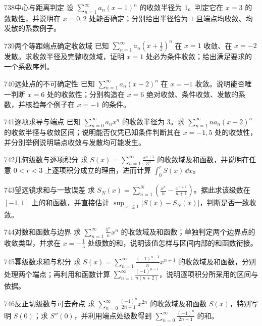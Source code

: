 \begin{exercise}{738}{中心与距离判定}
设 $\sum_{n=1}^{\infty}a_n(x-1)^n$ 的收敛半径为 $1$。判定它在 $x=3$ 的敛散性，并说明在 $x=0,2$ 处能否确定；分别给出半径恰为 $1$ 且端点均收敛、均发散的系数例子。
\end{exercise}
\begin{exercise}{739}{两个等距端点确定收敛域}
已知 $\sum_{n=1}^{\infty}a_n(x+\frac12)^n$ 在 $x=1$ 收敛、在 $x=-2$ 发散。求收敛半径及完整收敛域，证明 $x=1$ 处必为条件收敛；给出满足要求的一个系数序列。
\end{exercise}
\begin{exercise}{740}{远处点的不可确定性}
已知 $\sum_{n=1}^{\infty}a_n(x-2)^n$ 在 $x=-1$ 收敛。说明能否唯一判断 $x=6$ 处的收敛性；分别构造在 $x=6$ 绝对收敛、条件收敛、发散的系数，并核验每个例子在 $x=-1$ 的条件。
\end{exercise}
\begin{exercise}{741}{逐项求导与端点}
已知 $\sum_{n=0}^{\infty}a_nx^n$ 的收敛半径为 $3$。求 $\sum_{n=1}^{\infty}na_n(x-2)^n$ 的收敛半径与收敛区间；说明能否仅凭已知条件判断其在 $x=-1,5$ 处的收敛性，并分别举例说明端点收敛与发散均可能发生。
\end{exercise}
\begin{exercise}{742}{几何级数与逐项积分}
求 $S(x)=\sum_{n=1}^{\infty}\frac{x^{n+1}}{3^n}$ 的收敛域及和函数，并说明在任意 $0<r<3$ 上逐项积分成立的理由，进而计算 $\int_0^r S(x)\,\dd x$。
\end{exercise}
\begin{exercise}{743}{望远镜求和与一致误差}
求 $S_N(x)=\sum_{n=1}^{N}(\frac{x^n}{n}-\frac{x^{n+1}}{n+1})$。据此求该级数在 $[-1,1]$ 上的和函数，并直接估计 $\sup_{|x|\le1}|S(x)-S_N(x)|$，判断是否一致收敛。
\end{exercise}
\begin{exercise}{744}{对数和函数与边界}
求 $\sum_{n=1}^{\infty}\frac{5^n}{n}x^n$ 的收敛域及和函数；单独判定两个边界点的收敛类型，并求在 $x=-\frac15$ 处级数的和，说明该值怎样与区间内部的和函数衔接。
\end{exercise}
\begin{exercise}{745}{幂级数求和与积分}
求 $S(x)=\sum_{n=1}^{\infty}\frac{(-1)^{n-1}}n x^{n+1}$ 的收敛域及和函数，分别处理两个端点；再利用和函数计算 $\sum_{n=1}^{\infty}\frac{(-1)^{n-1}}{n(n+2)}$，说明逐项积分所采用的区间与依据。
\end{exercise}
\begin{exercise}{746}{反正切级数与可去奇点}
求 $\sum_{n=0}^{\infty}\frac{(-1)^n}{2n+1}x^{2n}$ 的收敛域及和函数 $S(x)$，特别写明 $S(0)$；求 $S''(0)$，并利用端点处级数得到 $\sum_{n=0}^{\infty}\frac{(-1)^n}{2n+1}$ 的和。
\end{exercise}
